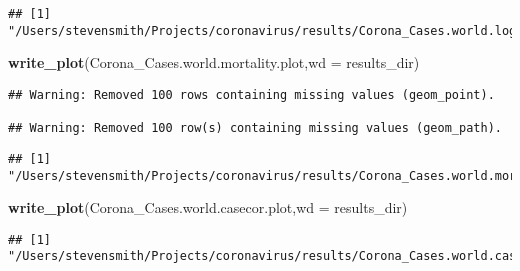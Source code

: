\documentclass[]{article}
\newenvironment{Shaded}{\begin{snugshade}}{\end{snugshade}}
\newcommand{\KeywordTok}[1]{\textcolor[rgb]{0.13,0.29,0.53}{\textbf{{#1}}}}
\newcommand{\DataTypeTok}[1]{\textcolor[rgb]{0.13,0.29,0.53}{{#1}}}
\newcommand{\NormalTok}[1]{{#1}}
\begin{document}
\begin{verbatim}
## [1] "/Users/stevensmith/Projects/coronavirus/results/Corona_Cases.world.loglong.plot.png"
\end{verbatim}

\begin{Shaded}
\begin{Highlighting}[]
\KeywordTok{write_plot}\NormalTok{(Corona_Cases.world.mortality.plot,}\DataTypeTok{wd =} \NormalTok{results_dir)}
\end{Highlighting}
\end{Shaded}

\begin{verbatim}
## Warning: Removed 100 rows containing missing values (geom_point).

## Warning: Removed 100 row(s) containing missing values (geom_path).
\end{verbatim}

\begin{verbatim}
## [1] "/Users/stevensmith/Projects/coronavirus/results/Corona_Cases.world.mortality.plot.png"
\end{verbatim}

\begin{Shaded}
\begin{Highlighting}[]
\KeywordTok{write_plot}\NormalTok{(Corona_Cases.world.casecor.plot,}\DataTypeTok{wd =} \NormalTok{results_dir)}
\end{Highlighting}
\end{Shaded}

\begin{verbatim}
## [1] "/Users/stevensmith/Projects/coronavirus/results/Corona_Cases.world.casecor.plot.png"
\end{verbatim}
\end{document}
